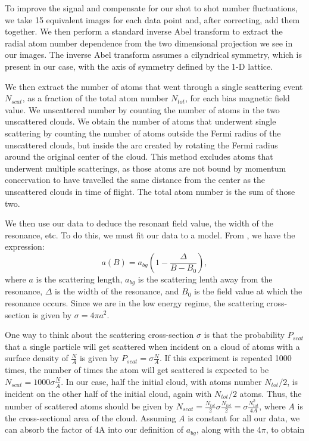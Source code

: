 \documentclass[12pt]{iopart}
\begin{document}
\par To improve the signal and compensate for our shot to shot number fluctuations, we take 15 equivalent images for each data point and, after correcting, add them together. We then perform a standard inverse Abel transform to extract the radial atom number dependence from the two dimensional projection we see in our images. The inverse Abel transform assumes a cilyndrical symmetry, which is present in our case, with the axis of symmetry defined by the 1-D lattice. 
\par We then extract the number of atoms that went through a single scattering event $N_{scat}$, as a fraction of the total atom number $N_{tot}$, for each bias magnetic field value. We unscattered number by counting the number of atoms in the two unscattered clouds. We obtain the number of atoms that underwent single scattering by counting the number of atoms outside the Fermi radius of the unscattered clouds, but inside the arc created by rotating the Fermi radius around the original center of the cloud. This method excludes atoms that underwent multiple scatterings, as those atoms are not bound by momentum concervation to have travelled the same distance from the center as the unscattered clouds in time of flight. The total atom number is the sum of those two.
\par We then use our data to deduce the resonant field value, the width of the resonance, etc. To do this, we must fit our data to a model. From \cite{Chin10}, we have the expression:
\begin{equation}
a(B)=a_{bg}\left(1-\frac{\Delta}{B-B_0}\right),
\end{equation}
where $a$ is the scattering length, $a_{bg}$ is the scattering lenth away from the resonance, $\Delta$ is the width of the resonance, and $B_0$ is the field value at which the resonance occurs. Since we are in the low energy regime, the scattering cross-section is given by $\sigma=4\pi a^2$. 
\par One way to think about the scattering cross-section $\sigma$ is that the probability $P_{scat}$ that a single particle will get scattered when incident on a cloud of atoms with a surface density of $\frac{N}{A}$ is given by $P_{scat}=\sigma \frac{N}{A}$. If this experiment is repeated 1000 times, the number of times the atom will get scattered is expected to be $N_{scat}=1000 \sigma \frac{N}{A}$.  In our case, half the initial cloud, with atoms number $N_{tot}/2$, is incident on the other half of the initial cloud, again with $N_{tot}/2$ atoms. Thus, the number of scattered atoms should be given by $N_{scat}=\frac{N_{tot}}{2} \sigma \frac{N_{tot}}{2}=\sigma \frac{N_{tot}^2}{4A}$, where $A$ is the cross-sectional area of the cloud. Assuming $A$ is constant for all our data, we can absorb the factor of 4A into our definition of $a_{bg}$, along with the $4\pi$, to obtain
\end{document}
